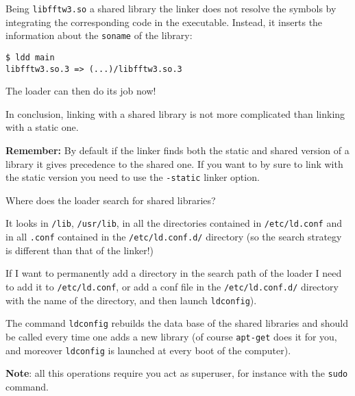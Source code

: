 \documentclass[10pt]{beamer}
\begin{document}
\begin{frame}[fragile]

Being \texttt{libfftw3.so} a shared library the linker does not
resolve the symbols by integrating the corresponding code in the
executable. Instead, it inserts the information about the
\texttt{soname} of the library:
\smallskip

\begin{verbatim}
$ ldd main
libfftw3.so.3 => (...)/libfftw3.so.3
\end{verbatim}
\smallskip
The loader can then do its job now!
\smallskip

In conclusion, linking with a shared library is not more complicated
than linking with a static one.
\medskip

\textbf{Remember:} By default if the linker finds both the static and
shared version of a library it gives precedence to the shared
one. If you want to by sure to link with the static version you need to use 
the \texttt{-static} linker option.
\end{frame}

\begin{frame}{Where does the loader search for shared libraries?}  

It looks in \texttt{/lib}, \texttt{/usr/lib}, in all the
directories contained in \texttt{/etc/ld.conf} and in all \texttt{.conf} contained in the \texttt{/etc/ld.conf.d/}
directory (so the search strategy is different than that of the
linker!) \smallskip

If I want to permanently add a directory in the search path of the
loader I need to add it to \texttt{/etc/ld.conf}, or add a conf file
in the \texttt{/etc/ld.conf.d/} directory with the name of the
directory, and then launch \texttt{ldconfig}).  \smallskip

The command \texttt{ldconfig} rebuilds the data base of the shared
libraries and should be called every time one adds a new library (of
course \texttt{apt-get} does it for you, and moreover
\texttt{ldconfig} is launched at every boot of the computer).
\smallskip

\textbf{Note}: all this operations require you act as superuser, for
instance with the \texttt{sudo} command.
\end{frame}
\end{document}
